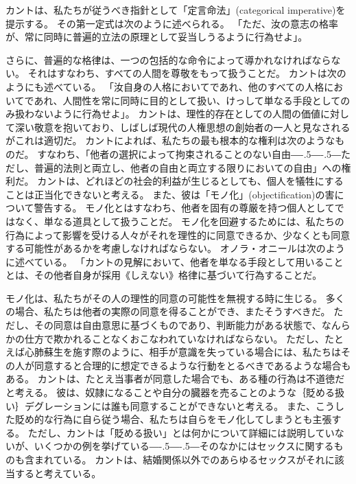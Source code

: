 \documentclass[paper=a4,book,openany]{jlreq}
\def\DDASH{―\kern-.5\zw―\kern-.5\zw―} %
\begin{document}
カントは、私たちが従うべき指針として「定言命法」(categorical imperative)を提示する。
その第一定式は次のように述べられる。
「ただ、汝の意志の格率が、常に同時に普遍的立法の原理として妥当しうるように行為せよ」\citep[4:421, p.34]{kant11:_groun_metap_moral}。

さらに、普遍的な格律は、一つの包括的な命令によって導かれなければならない。
それはすなわち、すべての人間を尊敬をもって扱うことだ。
カントは次のようにも述べている。
「汝自身の人格においてであれ、他のすべての人格においてであれ、人間性を常に同時に目的として扱い、けっして単なる手段としてのみ扱わないように行為せよ」\citep[4:429, p.41]{kant11:_groun_metap_moral}。
カントは、理性的存在としての人間の価値に対して深い敬意を抱いており、しばしば現代の人権思想の創始者の一人と見なされるがこれは適切だ。
カントによれば、私たちの最も根本的な権利は次のようなものだ。
すなわち、「他者の選択によって拘束されることのない自由{\DDASH}ただし、普遍的法則と両立し、他者の自由と両立する限りにおいての自由」\citep[6:237]{kant96:_metap_moral}への権利だ。
カントは、どれほどの社会的利益が生じるとしても、個人を犠牲にすることは正当化できないと考える。
また、彼は「モノ化」(objectification)の害について警告する。
モノ化とはすなわち、他者を固有の尊厳を持つ個人としてではなく、単なる道具として扱うことだ。
モノ化を回避するためには、私たちの行為によって影響を受ける人々がそれを理性的に同意できるか、少なくとも同意する可能性があるかを考慮しなければならない。
オノラ・オニールは次のように述べている。
「カントの見解において、他者を単なる手段として用いることとは、その他者自身が採用《しえない》格律に基づいて行為することだ\citep[p.138]{oneill89:_const_reason}。

モノ化は、私たちがその人の理性的同意の可能性を無視する時に生じる。
多くの場合、私たちは他者の実際の同意を得ることができ、またそうすべきだ。
ただし、その同意は自由意思に基づくものであり、判断能力がある状態で、なんらかの仕方で欺かれることなくおこなわれていなければならない。
ただし、たとえば心肺蘇生を施す際のように、相手が意識を失っている場合には、私たちはその人が同意すると合理的に想定できるような行動をとるべきであるような場合もある。
カントは、たとえ当事者が同意した場合でも、ある種の行為は不道徳だと考える。
彼は、奴隷になることや自分の臓器を売ることのような｛貶める扱い｝{デグレーション}には誰も同意することができないと考える。
また、こうした貶め的な行為に自ら従う場合、私たちは自らをモノ化してしまうとも主張する。
ただし、カントは「貶める扱い」とは何かについて詳細には説明していないが、いくつかの例を挙げている{\DDASH}そのなかにはセックスに関するものも含まれている。
カントは、結婚関係以外でのあらゆるセックスがそれに該当すると考えている。
\end{document}
